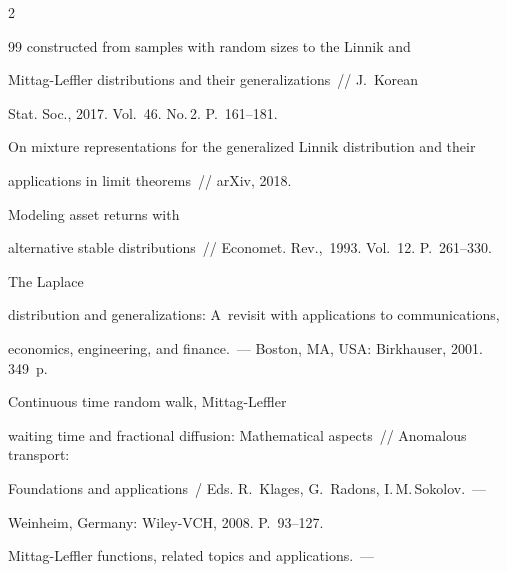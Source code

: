\begin{multicols}{2}
{{\begin{thebibliography}{99}
constructed from samples with random sizes to the Linnik and


Mittag-Leffler distributions and their generalizations~// J.~Korean 


Stat. Soc., 2017. Vol.~46. No.\,2. P.~161--181.









On mixture representations for the generalized Linnik distribution and their


applications in limit theorems~// arXiv, 2018.







 Modeling asset returns with


alternative stable distributions~// Economet. Rev.,~1993. Vol.~12. P.~261--330.







 The Laplace


distribution and generalizations: A~revisit with applications to communications, 


economics, engineering, and finance.~--- Boston, MA, USA: Birkhauser, 2001. 349~p.







 Continuous time random walk, Mittag-Leffler 


waiting time and fractional diffusion: Mathematical aspects~// Anomalous transport: 


Foundations and applications~/ Eds. R.~Klages, G.~Radons, I.\,M.\,Sokolov.~--- 


Weinheim, Germany: Wiley-VCH, 2008. P.~93--127.









Mittag-Leffler functions, related topics and applications.~--- 



\end{thebibliography}}}
\end{multicols}

